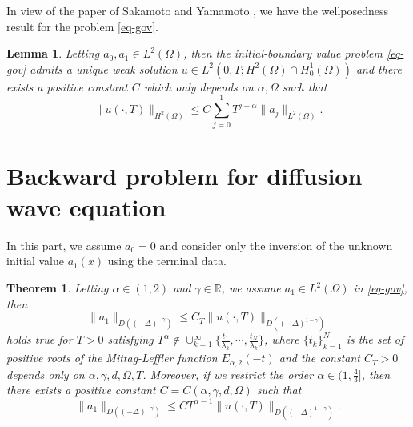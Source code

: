 \documentclass[11pt]{article}
\newtheorem{theorem}{Theorem}
\newtheorem{lemma}{Lemma}[section]
\numberwithin{equation}{section}
\begin{document}
In view of the paper of Sakamoto and Yamamoto \cite{sakamoto2011initial}, we have the wellposedness result for the problem \eqref{eq-gov}.
\begin{lemma}\label{lem-forward}
Letting $a_0,a_1\in L^2(\Omega)$, then the initial-boundary value problem \eqref{eq-gov} admits a unique weak solution $u\in L^2(0,T;H^2(\Omega)\cap H_0^1(\Omega))$ and there exists a positive constant $C$ which only depends on $\alpha,\Omega$ such that
$$
\|u(\cdot, T)\|_{H^2(\Omega)} \le C \sum_{j=0}^1 T^{j-\alpha} \|a_j\|_{L^2(\Omega)}.
$$
\end{lemma}


\section{Backward problem for diffusion wave equation}\label{sec-proof}
In this part,  we assume $a_0=0$ and consider only the inversion of the unknown initial value $a_1(x)$ using the terminal data.
\begin{theorem}\label{thm-isp}
Letting $\alpha\in(1,2)$ and $\gamma\in\mathbb R$, we assume $a_1\in L^2(\Omega)$ in \eqref{eq-gov}, then
\[
\|a_1\|_{D((-\Delta)^{-\gamma})} \leq C_T \|u(\cdot,T)\|_{D((-\Delta)^{1-\gamma})}
\]
holds true for $T>0$ satisfying $T^\alpha \not\in \cup_{k=1}^\infty \{ \frac{t_1}{\lambda_k}, \cdots, \frac{t_N}{\lambda_k}\}$, where $\{t_k\}_{k=1}^N$ is the set of positive roots of the Mittag-Leffler function $E_{\alpha,2}(-t)$ and the constant $C_T>0$ depends only on $\alpha,\gamma,d,\Omega,T$. Moreover, if we restrict the order $\alpha\in (1,\frac43]$, then there exists a positive constant $C=C(\alpha,\gamma,d,\Omega)$ such that
\[
\|a_1\|_{D((-\Delta)^{-\gamma})} \leq C T^{\alpha - 1} \|u(\cdot,T)\|_{D((-\Delta)^{1-\gamma})}.
\]
\end{theorem}
\end{document}
